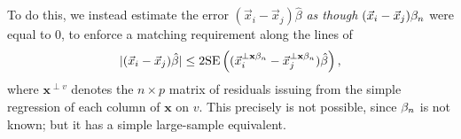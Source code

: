 \documentclass{article}
\theoremstyle{remark}
\begin{document}
To do this, we instead estimate the error $(\vec{x}_i - \vec{x}_j)\hat{\beta} $ \emph{as though}
$(\vec{x}_i - \vec{x}_j){\beta_{n }}$ were equal to 0, to enforce a matching requirement along the lines of
\begin{equation*}
|(\vec{x}_i - \vec{x}_j)\hat{\beta}| \leq 2 \mathrm{SE}\left( (\vec{x}_i^{\perp \mathbf{x}\beta_{n }} - \vec{x}_j^{\perp \mathbf{x}\beta_{n }})\hat{\beta}\right) ,
\end{equation*}
where $\mathbf{x}^{\perp v}$ denotes the 
$n \times p$ matrix of residuals issuing from the simple regression of
each column of $\mathbf{x}$ on $v$.  This precisely is not possible, since $\beta_{n }$ is not known; but it has a simple large-sample equivalent. 
\end{document}
